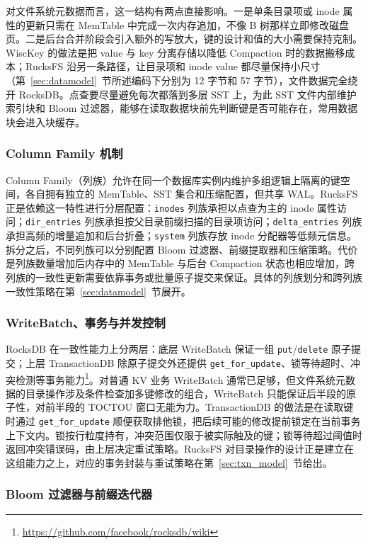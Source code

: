 对文件系统元数据而言，这一结构有两点直接影响。一是单条目录项或 inode 属性的更新只需在 MemTable 中完成一次内存追加，不像 B 树那样立即修改磁盘页。二是后台合并阶段会引入额外的写放大，键的设计和值的大小需要保持克制。WiscKey\cite{lu2016wisckey} 的做法是把 value 与 key 分离存储以降低 Compaction 时的数据搬移成本；RucksFS 沿另一条路径，让目录项和 inode value 都尽量保持小尺寸（第~\ref{sec:datamodel}~节所述编码下分别为 12 字节和 57 字节），文件数据完全绕开 RocksDB。点查要尽量避免每次都落到多层 SST 上，为此 SST 文件内部维护索引块和 Bloom 过滤器，能够在读取数据块前先判断键是否可能存在，常用数据块会进入块缓存。

\subsubsection{Column Family 机制}

Column Family（列族）允许在同一个数据库实例内维护多组逻辑上隔离的键空间，各自拥有独立的 MemTable、SST 集合和压缩配置，但共享 WAL。RucksFS 正是依赖这一特性进行分层配置：\texttt{inodes} 列族承担以点查为主的 inode 属性访问；\texttt{dir\_entries} 列族承担按父目录前缀扫描的目录项访问；\texttt{delta\_entries} 列族承担高频的增量追加和后台折叠；\texttt{system} 列族存放 inode 分配器等低频元信息。拆分之后，不同列族可以分别配置 Bloom 过滤器、前缀提取器和压缩策略。代价是列族数量增加后内存中的 MemTable 与后台 Compaction 状态也相应增加，跨列族的一致性更新需要依靠事务或批量原子提交来保证。具体的列族划分和跨列族一致性策略在第~\ref{sec:datamodel}~节展开。

\subsubsection{WriteBatch、事务与并发控制}

RocksDB 在一致性能力上分两层：底层 WriteBatch 保证一组 \texttt{put}/\texttt{delete} 原子提交；上层 TransactionDB 除原子提交外还提供 \texttt{get\_for\_update}、锁等待超时、冲突检测等事务能力\footnote{\url{https://github.com/facebook/rocksdb/wiki}}。对普通 KV 业务 WriteBatch 通常已足够，但文件系统元数据的目录操作涉及条件检查加多键修改的组合，WriteBatch 只能保证后半段的原子性，对前半段的 TOCTOU 窗口无能为力。TransactionDB 的做法是在读取键时通过 \texttt{get\_for\_update} 顺便获取排他锁，把后续可能的修改提前锁定在当前事务上下文内。锁按行粒度持有，冲突范围仅限于被实际触及的键；锁等待超过阈值时返回冲突错误码，由上层决定重试策略。RucksFS 对目录操作的设计正是建立在这组能力之上，对应的事务封装与重试策略在第~\ref{sec:txn_model}~节给出。

\subsubsection{Bloom 过滤器与前缀迭代器}


